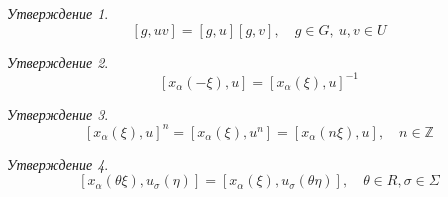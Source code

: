 \documentclass[10pt]{article}
\theoremstyle{remark}
\newtheorem{prop}{Утверждение}
\newcommand{\Z}{\mathbb{Z}}
\begin{document}
\begin{prop}
  $$[g,uv] = [g,u][g,v], \quad g \in G, \ u,v \in U $$
\end{prop}

\begin{prop}
  $$[x_\alpha(-\xi),u] = [x_\alpha(\xi),u]^{-1}$$
\end{prop}
  


\begin{prop}
  $$[x_\alpha(\xi),u]^n = [x_\alpha(\xi),u^n] = [x_\alpha(n\xi),u], \quad n \in \Z$$
\end{prop}








\begin{prop}
  $$[x_\alpha(\theta\xi),u_\sigma(\eta)] = [x_\alpha(\xi),u_\sigma(\theta\eta)], \quad \theta \in R, \sigma \in \Sigma$$
\end{prop}
\end{document}
